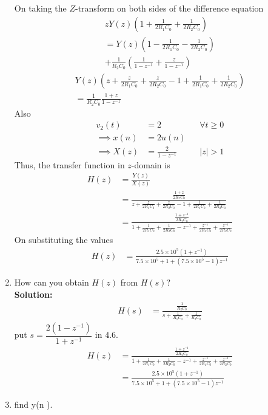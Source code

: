 \documentclass[journal,12pt,twocolumn]{IEEEtran}
\newcommand{\solution}{\noindent \textbf{Solution: }}
\providecommand{\brak}[1]{\ensuremath{\left(#1\right)}}
\providecommand{\abs}[1]{\left\vert#1\right\vert}
\numberwithin{equation}{section}
\renewcommand\thesection{\arabic{section}}
\begin{document}
\begin{enumerate}[label=\arabic*.,ref=\thesection.\theenumi]
	On taking the $Z$-transform on both sides of the difference equation
	\begin{multline}
		zY(z)\brak{1 + \frac{1}{2R_1C_0} + \frac{1}{2R_2C_0}} \\= Y(z)\brak{1 - \frac{1}{2R_1C_0} - \frac{1}{2R_2C_0}} \\+ \frac{1}{R_2C_0} \brak{\frac{1}{1-z^{-1}} + \frac{z}{1-z^{-1}}}
	\end{multline}
	\begin{multline}
		Y(z)\brak{z + \frac{z}{2R_1C_0} + \frac{z}{2R_2C_0} - 1 + \frac{1}{2R_1C_0} + \frac{1}{2R_2C_0}} \\
		= \frac{1}{R_2C_0} \frac{1+z}{1-z^{-1}}
	\end{multline}
	Also
	\begin{align}
		v_2(t) &= 2 &&\forall t \ge 0\\
		\implies x(n) &= 2u(n) \\
		\implies X(z) &= \frac{2}{1-z^{-1}} &&\abs{z} > 1
	\end{align}
	Thus, the transfer function in $z$-domain is
	\begin{align}
		H(z) &= \frac{Y(z)}{X(z)} \\
		&= \frac{\frac{1+z}{2R_2C_0}}{z + \frac{z}{2R_1C_0} + \frac{z}{2R_2C_0} - 1 + \frac{1}{2R_1C_0} + \frac{1}{2R_2C_0}} \\
		&= \frac{\frac{1 + z^{-1}}{2R_2C_0}}{1 + \frac{1}{2R_1C_0} + \frac{1}{2R_2C_0} - z^{-1} + \frac{z^{-1}}{2R_1C_0} + \frac{z^{-1}}{2R_2C_0}}
	\end{align}
	On substituting the values
	\begin{align}
		H(z) &= \frac{2.5\times10^5 (1+z^{-1})}{7.5\times10^5 + 1 + (7.5\times10^5 - 1)z^{-1}}
	\end{align}
	\item How can you obtain $H(z)$ from $H(s)$?\\
	\solution
	\begin{align}
		H(s) &= \frac{\frac{1}{R_2C_0}}{s + \frac{1}{R_1C_0} + \frac{1}{R_2C_0}}
	\end{align}
		put $s=\dfrac{2(1-z^{-1})}{1+z^{-1}}$ in $4.6$.
	\begin{align}
		H(z) &= \frac{\frac{1 + z^{-1}}{2R_2C_0}}{1 + \frac{1}{2R_1C_0} + \frac{1}{2R_2C_0} - z^{-1} + \frac{z^{-1}}{2R_1C_0} + \frac{z^{-1}}{2R_2C_0}} \\
		&= \frac{2.5\times10^5 (1+z^{-1})}{7.5\times10^5 + 1 + (7.5\times10^5 - 1)z^{-1}}
	\end{align}
	\item find y(n ).\\

\end{enumerate}
\end{document}
